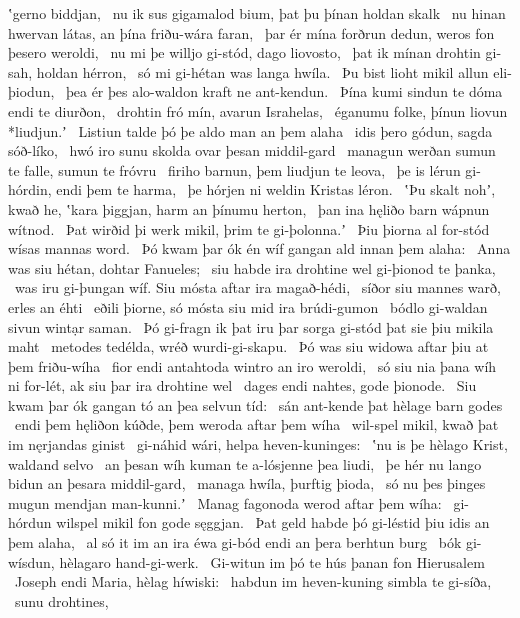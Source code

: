 ʽgerno biddjan, \hld\ nu ik sus gigamalod bium,
þat þu þínan holdan skalk \hld\ nu hinan hwervan látas,
an þína friðu-wára faran, \hld\ þar ér mína forðrun dedun,
weros fon þesero weroldi, \hld\ nu mi þe willjo gi-stód,
dago liovosto, \hld\ þat ik mínan drohtin gi-sah,
holdan hérron, \hld\ só mi gi-hétan was
langa hwíla. \hld\ Þu bist lioht mikil
allun eli-þiodun, \hld\ þea ér þes alo-waldon
kraft ne ant-kendun. \hld\ Þína kumi sindun
te dóma endi te diurðon, \hld\ drohtin fró mín,
avarun Israhelas, \hld\ éganumu folke,
þínun liovun *liudjun.ʼ \hld\ Listiun talde þó
þe aldo man an þem alaha \hld\ idis þero gódun,
sagda sóð-líko, \hld\ hwó iro sunu skolda
ovar þesan middil-gard \hld\ managun werðan
sumun te falle, sumun te fróvru \hld\ firiho barnun,
þem liudjun te leova, \hld\ þe is lérun gi-hórdin,
endi þem te harma, \hld\ þe hórjen ni weldin
Kristas léron. \hld\ ʽÞu skalt nohʼ, kwað he, ʽkara þiggjan,
harm an þínumu herton, \hld\ þan ina hęliðo barn
wápnun wítnod. \hld\ Þat wirðid þi werk mikil,
þrim te gi-þolonna.ʼ \hld\ Þiu þiorna al for-stód
wísas mannas word. \hld\ Þó kwam þar ók én wíf gangan
ald innan þem alaha: \hld\ Anna was siu hétan,
dohtar Fanueles; \hld\ siu habde ira drohtine wel
gi-þionod te þanka, \hld\ was iru gi-þungan wíf.
Siu mósta aftar ira magað-hédi, \hld\ síðor siu mannes warð,
erles an éhti \hld\ eðili þiorne,
só mósta siu mid ira brúdi-gumon \hld\ bódlo gi-waldan
sivun wintạr saman. \hld\ Þó gi-fragn ik þat iru þar sorga gi-stód
þat sie þiu mikila maht \hld\ metodes tedélda,
wréð wurdi-gi-skapu. \hld\ Þó was siu widowa aftar þiu
at þem friðu-wíha \hld\ fior endi antahtoda
wintro an iro weroldi, \hld\ só siu nia þana wíh ni for-lét,
ak siu þar ira drohtine wel \hld\ dages endi nahtes,
gode þionode. \hld\ Siu kwam þar ók gangan tó
an þea selvun tíd: \hld\ sán ant-kende
þat hèlage barn godes \hld\ endi þem hęliðon kúðde,
þem weroda aftar þem wíha \hld\ wil-spel mikil,
kwað þat im nęrjandas ginist \hld\ gi-náhid wári,
helpa heven-kuninges: \hld\ ʽnu is þe hèlago Krist,
waldand selvo \hld\ an þesan wíh kuman
te a-lósjenne þea liudi, \hld\ þe hér nu lango bidun
an þesara middil-gard, \hld\ managa hwíla,
þurftig þioda, \hld\ só nu þes þinges mugun
mendjan man-kunni.ʼ \hld\ Manag fagonoda
werod aftar þem wíha: \hld\ gi-hórdun wilspel mikil
fon gode sęggjan. \hld\ Þat geld habde þó gi-léstid
þiu idis an þem alaha, \hld\ al só it im an ira éwa gi-bód
endi an þera berhtun burg \hld\ bók gi-wísdun,
hèlagaro hand-gi-werk. \hld\ Gi-witun im þó te hús þanan
fon Hierusalem \hld\ Joseph endi Maria,
hèlag híwiski: \hld\ habdun im heven-kuning
simbla te gi-síða, \hld\ sunu drohtines,
